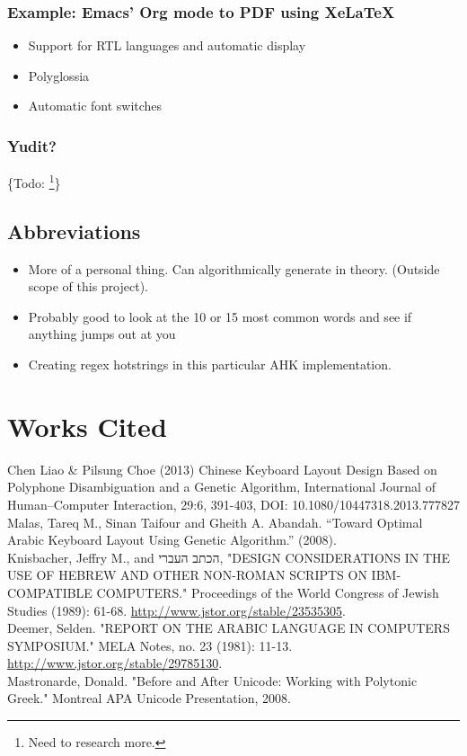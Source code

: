 \documentclass[11pt]{article}
\begin{document}
\subsubsection{Example: Emacs' Org mode to PDF using XeLaTeX}
\label{sec:org41f664d}

\begin{itemize}
\item Support for RTL languages and automatic display
\item Polyglossia
\item Automatic font switches
\end{itemize}

\subsubsection{Yudit?}
\label{sec:orga479ed7}

\{Todo: \footnote{Need to research more.}\}

\subsection{Abbreviations}
\label{sec:orge721369}

\begin{itemize}
\item More of a personal thing. Can algorithmically generate in theory. (Outside scope of this project).
\item Probably good to look at the 10 or 15 most common words and see if anything jumps out at you
\item Creating regex hotstrings in this particular AHK implementation.
\end{itemize}

\section{Works Cited}
\label{sec:org5c1de34}

Chen Liao \& Pilsung Choe (2013) Chinese Keyboard Layout Design Based on Polyphone Disambiguation and a Genetic Algorithm, International Journal of Human–Computer Interaction, 29:6, 391-403, DOI: 10.1080/10447318.2013.777827 \\

Malas, Tareq M., Sinan Taifour and Gheith A. Abandah. “Toward Optimal Arabic Keyboard Layout Using Genetic Algorithm.” (2008). \\

Knisbacher, Jeffry M., and \texthebrew{הכתב העברי}, "DESIGN CONSIDERATIONS IN THE USE OF HEBREW AND OTHER NON-ROMAN SCRIPTS ON IBM-COMPATIBLE COMPUTERS." Proceedings of the World Congress of Jewish Studies (1989): 61-68. \url{http://www.jstor.org/stable/23535305}. \\

Deemer, Selden. "REPORT ON THE ARABIC LANGUAGE IN COMPUTERS SYMPOSIUM." MELA Notes, no. 23 (1981): 11-13. \url{http://www.jstor.org/stable/29785130}. \\

Mastronarde, Donald. "Before and After Unicode: Working with Polytonic Greek." Montreal APA Unicode Presentation, 2008.
\end{document}
